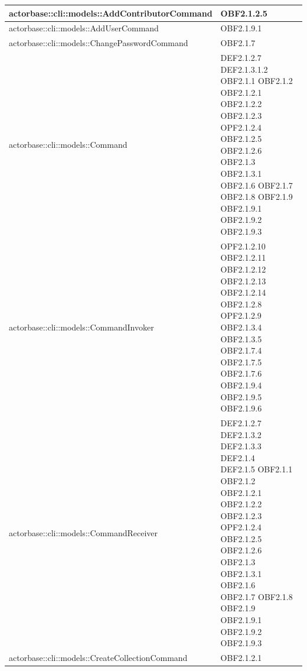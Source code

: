 \documentclass{scalatekids-article}
\begin{document}
\begin{longtable}[H]{|p{11.5cm}|p{5.5cm}|}
\hline
actorbase::cli::models::AddContributorCommand & \multiLineCell[t]{OBF2.1.2.5\\}\\
\hline
actorbase::cli::models::AddUserCommand & \multiLineCell[t]{OBF2.1.9.1\\}\\
\hline
actorbase::cli::models::ChangePasswordCommand & \multiLineCell[t]{OBF2.1.7\\}\\
\hline
actorbase::cli::models::Command & \multiLineCell[t]{DEF2.1.2.7 DEF2.1.3.1.2\\OBF2.1.1 OBF2.1.2\\OBF2.1.2.1 OBF2.1.2.2\\OBF2.1.2.3 OPF2.1.2.4\\OBF2.1.2.5 OBF2.1.2.6\\OBF2.1.3 OBF2.1.3.1\\OBF2.1.6 OBF2.1.7\\OBF2.1.8 OBF2.1.9\\OBF2.1.9.1 OBF2.1.9.2\\OBF2.1.9.3}\\
\hline
actorbase::cli::models::CommandInvoker & \multiLineCell[t]{OPF2.1.2.10 OBF2.1.2.11\\OBF2.1.2.12 OBF2.1.2.13\\OBF2.1.2.14 OBF2.1.2.8\\OPF2.1.2.9 OBF2.1.3.4\\OBF2.1.3.5 OBF2.1.7.4\\OBF2.1.7.5 OBF2.1.7.6\\OBF2.1.9.4 OBF2.1.9.5\\OBF2.1.9.6}\\
\hline
actorbase::cli::models::CommandReceiver & \multiLineCell[t]{DEF2.1.2.7 DEF2.1.3.2\\DEF2.1.3.3 DEF2.1.4\\DEF2.1.5 OBF2.1.1\\OBF2.1.2 OBF2.1.2.1\\OBF2.1.2.2 OBF2.1.2.3\\OPF2.1.2.4 OBF2.1.2.5\\OBF2.1.2.6 OBF2.1.3\\OBF2.1.3.1 OBF2.1.6\\OBF2.1.7 OBF2.1.8\\OBF2.1.9 OBF2.1.9.1\\OBF2.1.9.2 OBF2.1.9.3\\}\\
\hline
actorbase::cli::models::CreateCollectionCommand & \multiLineCell[t]{OBF2.1.2.1\\}\\

\end{longtable}
\end{document}
